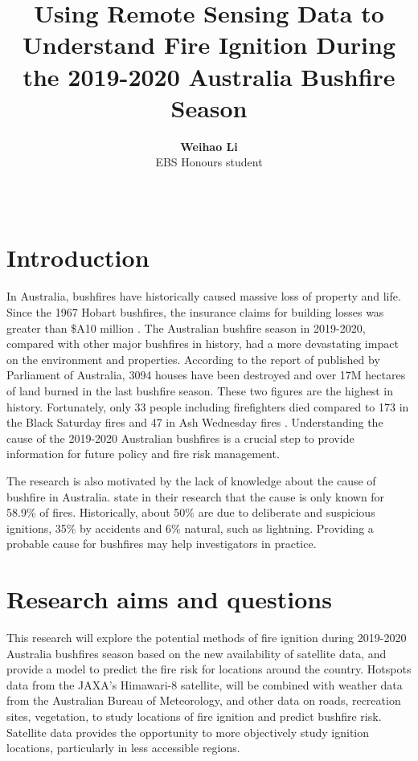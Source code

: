\documentclass[11pt,a4paper,]{article}
\title{Using Remote Sensing Data to Understand Fire Ignition During the 2019-2020 Australia Bushfire Season}
\author{\sf\Large\textbf{ Weihao Li}\\ {\sf\large EBS Honours student\\[0.5cm]}}
\date{\sf\Date~\Month~\Year}
\makeatletter
\def\titlepage{\front{\expandafter{\@title}}{\@author}{\@organization}}
\makeatother
\begin{document}
\titlepage

\hypertarget{introduction}{%
\section{Introduction}\label{introduction}}

In Australia, bushfires have historically caused massive loss of property and life. Since the 1967 Hobart bushfires, the insurance claims for building losses was greater than \$A10 million \autocite{mcaneney2009100}.
The Australian bushfire season in 2019-2020, compared with other major bushfires in history, had a more devastating impact on the environment and properties. According to the report of \textcite{LisaRichardsNigelBrew2020} published by Parliament of Australia, 3094 houses have been destroyed and over 17M hectares of land burned in the last bushfire season. These two figures are the highest in history. Fortunately, only 33 people including firefighters died compared to 173 in the Black Saturday fires and 47 in Ash Wednesday fires \autocite{LisaRichardsNigelBrew2020}.
Understanding the cause of the 2019-2020 Australian bushfires is a crucial step to provide information for future policy and fire risk management.

The research is also motivated by the lack of knowledge about the cause of bushfire in Australia. \textcite{beale2011preventing} state in their research that the cause is only known for 58.9\% of fires. Historically, about 50\% are due to deliberate and suspicious ignitions, 35\% by accidents and 6\% natural, such as lightning. Providing a probable cause for bushfires may help investigators in practice.

\hypertarget{research-aims-and-questions}{%
\section{Research aims and questions}\label{research-aims-and-questions}}

This research will explore the potential methods of fire ignition during 2019-2020 Australia bushfires season based on the new availability of satellite data, and provide a model to predict the fire risk for locations around the country. Hotspots data from the JAXA's Himawari-8 satellite, will be combined with weather data from the Australian Bureau of Meteorology, and other data on roads, recreation sites, vegetation, to study locations of fire ignition and predict bushfire risk. Satellite data provides the opportunity to more objectively study ignition locations, particularly in less accessible regions.
\end{document}
